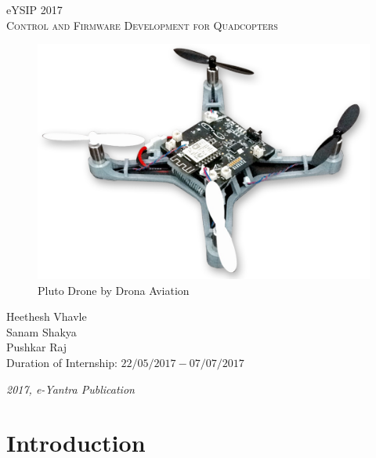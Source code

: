 \documentclass[a4paper,12pt,oneside]{book}
\begin{document}
\begin{titlepage}
\raggedright
{\Large eYSIP 2017\\[1cm]}
{\Huge \scshape Control and Firmware Development for Quadcopters \\[.1in]}

\vfill

\begin{figure}[!htb]
\centering
\includegraphics[width=\textwidth]{images/pluto_drone}
Pluto Drone by Drona Aviation
\end{figure}

\vfill

\begin{flushright}
{\large Heethesh Vhavle \\}
{\large Sanam Shakya \\}
{\large Pushkar Raj \\}
\vspace{0.5cm}
{\large Duration of Internship: $ 22/05/2017-07/07/2017 $ \\}
\end{flushright}
\medskip

{\itshape 2017, e-Yantra Publication}
\end{titlepage}


\tableofcontents
\listoffigures


\chapter[Introduction]{Introduction}
\end{document}
